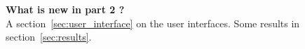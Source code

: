\vspace*{5cm}

\begin{flushright}
  
  \textbf{What is new in part 2 ?}~\\
  A section~\ref{sec:user_interface} on the user interfaces.
  Some results in section~\ref{sec:results}.
  
\end{flushright}
